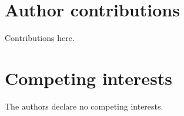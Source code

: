 \documentclass[12pt]{article}
\begin{document}
\section*{Author contributions}
Contributions here.

\section*{Competing interests}
The authors declare no competing interests.



\end{document}
